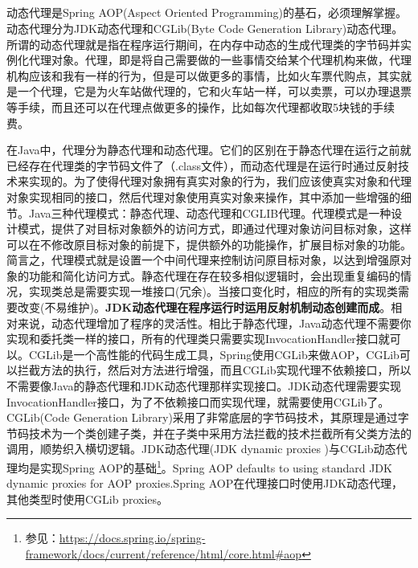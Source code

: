 \documentclass[../../../interview-questions.tex]{subfiles}
\begin{document}
\subsection{\color{red}{Java的静态代理(Static Proxy)和动态代理(Dynamic Proxy)有什么差别？}}

动态代理是Spring AOP(Aspect Oriented Programming)的基石，必须理解掌握。动态代理分为JDK动态代理和CGLib(Byte Code Generation Library)动态代理。所谓的动态代理就是指在程序运行期间，在内存中动态的生成代理类的字节码并实例化代理对象。代理，即是将自己需要做的一些事情交给某个代理机构来做，代理机构应该和我有一样的行为，但是可以做更多的事情，比如火车票代购点，其实就是一个代理，它是为火车站做代理的，它和火车站一样，可以卖票，可以办理退票等手续，而且还可以在代理点做更多的操作，比如每次代理都收取5块钱的手续费。

在Java中，代理分为静态代理和动态代理。它们的区别在于静态代理在运行之前就已经存在代理类的字节码文件了（.class文件），而动态代理是在运行时通过反射技术来实现的。为了使得代理对象拥有真实对象的行为，我们应该使真实对象和代理对象实现相同的接口，然后代理对象使用真实对象来操作，其中添加一些增强的细节。Java三种代理模式：静态代理、动态代理和CGLIB代理。代理模式是一种设计模式，提供了对目标对象额外的访问方式，即通过代理对象访问目标对象，这样可以在不修改原目标对象的前提下，提供额外的功能操作，扩展目标对象的功能。简言之，代理模式就是设置一个中间代理来控制访问原目标对象，以达到增强原对象的功能和简化访问方式。静态代理在存在较多相似逻辑时，会出现重复编码的情况，实现类总是需要实现一堆接口(冗余)。当接口变化时，相应的所有的实现类需要改变(不易维护)。\textbf{JDK动态代理在程序运行时运用反射机制动态创建而成}。相对来说，动态代理增加了程序的灵活性。相比于静态代理，Java动态代理不需要你实现和委托类一样的接口，所有的代理类只需要实现InvocationHandler接口就可以。CGLib是一个高性能的代码生成工具，Spring使用CGLib来做AOP，CGLib可以拦截方法的执行，然后对方法进行增强，而且CGLib实现代理不依赖接口，所以不需要像Java的静态代理和JDK动态代理那样实现接口。JDK动态代理需要实现InvocationHandler接口，为了不依赖接口而实现代理，就需要使用CGLib了。CGLib(Code Generation Library)采用了非常底层的字节码技术，其原理是通过字节码技术为一个类创建子类，并在子类中采用方法拦截的技术拦截所有父类方法的调用，顺势织入横切逻辑。JDK动态代理(JDK dynamic proxies )与CGLib动态代理均是实现Spring AOP的基础\footnote{参见：\url{https://docs.spring.io/spring-framework/docs/current/reference/html/core.html\#aop}}。Spring AOP defaults to using standard JDK dynamic proxies for AOP proxies.Spring AOP在代理接口时使用JDK动态代理，其他类型时使用CGLib proxies。
\end{document}
